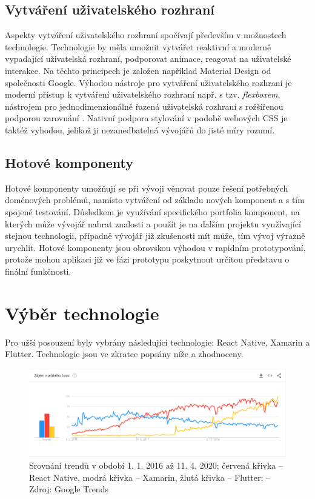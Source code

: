 \subsection{Vytváření uživatelského rozhraní}

Aspekty vytváření uživatelského rozhraní spočívají především v možnostech technologie. Technologie by měla umožnit vytvářet reaktivní a moderně vypadající uživatelská rozhraní, podporovat animace, reagovat na uživatelské interakce. Na těchto principech je založen například Material Design od společnosti Google. Výhodou nástroje pro vytváření uživatelského rozhraní je moderní přístup k vytváření uživatelského rozhraní např. s tzv. \emph{flexboxem}, nástrojem pro jednodimenzionálně řazená uživatelská rozhraní s rožšířenou podporou zarovnání \cite{FlexboxMDN}. Nativní podpora stylování v podobě webových CSS je taktéž vyhodou, jelikož ji nezanedbatelná vývojářů do jisté míry rozumí.

\subsection{Hotové komponenty}

Hotové komponenty umožňují se při vývoji věnovat pouze řešení potřebných doménových problémů, namísto vytváření od základu nových komponent a s tím spojené testování. Důsledkem je využívání specifického portfolia komponent, na kterých může vývojář nabrat znalosti a použít je na dalším projektu využívající stejnou technologii, případně vývojář již zkušenosti mít může, tím vývoj výrazně urychlit. Hotové komponenty jsou obrovskou výhodou v rapidním prototypování, protože mohou aplikaci již ve fázi prototypu poskytnout určitou představu o finální funkčnosti.

\section{Výběr technologie}


Pro užší posouzení byly vybrány následující technologie: React Native, Xamarin a Flutter. Technologie jsou ve zkratce popsány níže a zhodnoceny.

\begin{figure}[h]
	\includegraphics[width=\linewidth]{img/google_trends.png}
	\caption{Srovnání trendů v období 1. 1. 2016 až 11. 4. 2020; červená křivka -- React Native, modrá křivka -- Xamarin, žlutá křivka -- Flutter; -- Zdroj: Google Trends}
	\label{fig:gtrends}
\end{figure}

